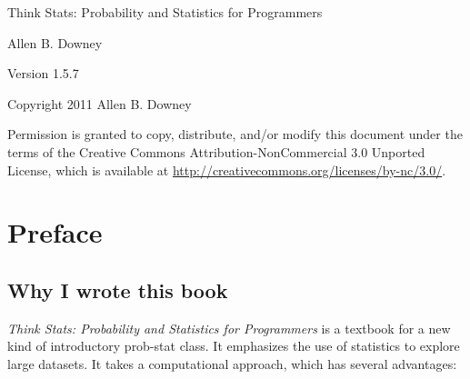 \documentclass[12pt]{book}
\newcommand{\thetitle}{Think Stats: Probability and Statistics for Programmers}
\newcommand{\theversion}{1.5.7}
\begin{document}
\begin{htmlonly}


{\Large \thetitle}

{\large Allen B. Downey}

Version \theversion

\vspace{0.25in}

Copyright 2011 Allen B. Downey

\vspace{0.25in}

Permission is granted to copy, distribute, and/or modify this document
under the terms of the Creative Commons Attribution-NonCommercial 3.0
Unported License, which is available at
\url{http://creativecommons.org/licenses/by-nc/3.0/}.

\setcounter{chapter}{-1}

\end{htmlonly}

\fi

\chapter{Preface}
\label{preface}

\section*{Why I wrote this book}

{\em Think Stats: Probability and Statistics for Programmers} is a
textbook for a new kind of introductory prob-stat class.  
It emphasizes the use of statistics to explore large datasets.  It
takes a computational approach, which has several advantages:
\end{document}
